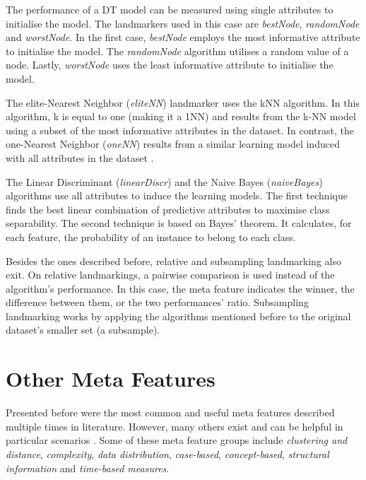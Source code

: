 The performance of a DT model can be measured using single attributes to initialise the model. The landmarkers used in this case are \textit{bestNode}, \textit{randomNode} and \textit{worstNode}. In the first case, \textit{bestNode} employs the most informative attribute to initialise the model. The \textit{randomNode} algorithm utilises a random value of a node. Lastly, \textit{worstNode} uses the least informative attribute to initialise the model.

The elite-Nearest Neighbor (\textit{eliteNN}) landmarker uses the kNN algorithm. In this algorithm, k is equal to one (making it a 1NN) and results from the k-NN model using a subset of the most informative attributes in the dataset. In contrast, the one-Nearest Neighbor (\textit{oneNN}) results from a similar learning model induced with all attributes in the dataset \citep{kramer2013k}.

The Linear Discriminant (\textit{linearDiscr}) and the Naive Bayes (\textit{naiveBayes}) algorithms use all attributes to induce the learning models. The first technique finds the best linear combination of predictive attributes to maximise class separability. The second technique is based on Bayes' theorem. It calculates, for each feature, the probability of an instance to belong to each class.

Besides the ones described before, relative and subsampling landmarking also exit. On relative landmarkings, a pairwise comparison is used instead of the algorithm's performance. In this case, the meta feature indicates the winner, the difference between them, or the two performances' ratio. Subsampling landmarking works by applying the algorithms mentioned before to the original dataset's smaller set (a subsample).

\section{Other Meta Features}
\label{sec:omf}
Presented before were the most common and useful meta features described multiple times in literature. However, many others exist and can be helpful in particular scenarios \citep{rivolli2022meta}. Some of these meta feature groups include \textit{clustering and distance}, \textit{complexity}, \textit{data distribution}, \textit{case-based}, \textit{concept-based}, \textit{structural information} and \textit{time-based measures}.

